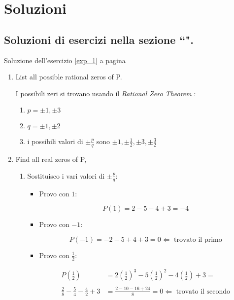 \section{Soluzioni}

\subsection{Soluzioni di esercizi nella sezione ``\textbf{}".}

Soluzione dell'esercizio \ref{exp_1} a pagina \pageref{exp_1}\label{poli_1}


\begin{enumerate}
\item List all possible rational zeros of P.

I possibili zeri si trovano usando il \emph{Rational Zero Theorem} :

\begin{enumerate}
\item $p=\pm 1, \pm 3$
\item $q=\pm 1, \pm 2$
\item i possibili valori di $\pm \frac{p}{q}$ sono $\pm 1, \pm \frac{1}{2}, \pm 3, \pm \frac{3}{2}$
\end{enumerate}

\item Find all real zeros of P,

\begin{enumerate}
\item Sostituisco i vari valori di $\pm \frac{p}{q}$:
\setcounter{equation}{0}

\begin{itemize}

\item Provo con $1$:

\[
P(1)=2-5-4+3=-4
\]

\item Provo con $-1$:

\[
P(-1)=-2-5+4+3=0 \Leftarrow \textrm{ trovato il primo}
\]

\item Provo con $\frac{1}{2}$:

\[
\begin{split}
P\left(\frac{1}{2}\right)&=2\left(\frac{1}{2}\right)^3-5\left(\frac{1}{2}\right)^2-4\left(\frac{1}{2}\right)+3= \\
\\
\frac{2}{8}-\frac{5}{4}-\frac{4}{2}+3&=\frac{2-10-16+24}{8}=0 \Leftarrow \textrm{ trovato il secondo}
\end{split}
\]


\end{itemize}
\end{enumerate}
\end{enumerate}
